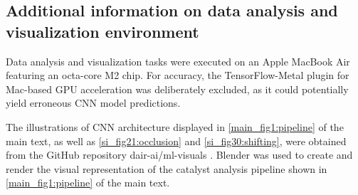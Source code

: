 \subsection{Additional information on data analysis and visualization environment}
\label{si_sec4.2_vis_env}
Data analysis and visualization tasks were executed on an Apple MacBook Air featuring an octa-core M2 chip.
For accuracy, the TensorFlow-Metal plugin for Mac-based GPU acceleration was deliberately excluded,
as it could potentially yield erroneous CNN model predictions.

The illustrations of CNN architecture displayed in \cref{main_fig1:pipeline} of the main text,
as well as \cref{si_fig21:occlusion} and \cref{si_fig30:shifting},
were obtained from the GitHub repository dair-ai/ml-visuals \cite{Saravia_ML_Visuals_2021}.
Blender was used to create and render the visual representation of the catalyst analysis pipeline shown in \cref{main_fig1:pipeline} of the main text.

